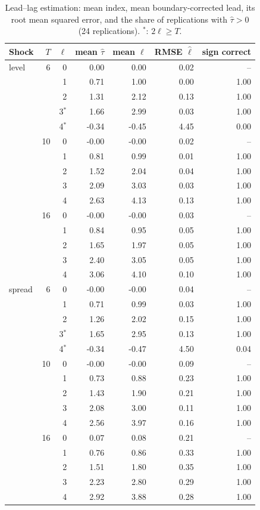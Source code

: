 \documentclass[12pt]{article}
\begin{document}
\begin{table}[h]
\caption{Lead--lag estimation: mean index, mean boundary-corrected lead, its root mean squared error, and the share of replications with $\hat\tau>0$ (24 replications). $^\ast$: $2\ell\ge T$.}\label{tab:ll}
\centering\footnotesize
\begin{tabular}{lrrrrrr}
\toprule
Shock & $T$ & $\ell$ & mean $\hat\tau$ & mean $\hat\ell$ & RMSE $\hat\ell$ & sign correct\\
\midrule
level & 6 & 0 & 0.00 & 0.00 & 0.02 & --\\
 &  & 1 & 0.71 & 1.00 & 0.00 & 1.00\\
 &  & 2 & 1.31 & 2.12 & 0.13 & 1.00\\
 &  & 3$^\ast$ & 1.66 & 2.99 & 0.03 & 1.00\\
 &  & 4$^\ast$ & -0.34 & -0.45 & 4.45 & 0.00\\
\addlinespace
 & 10 & 0 & -0.00 & -0.00 & 0.02 & --\\
 &  & 1 & 0.81 & 0.99 & 0.01 & 1.00\\
 &  & 2 & 1.52 & 2.04 & 0.04 & 1.00\\
 &  & 3 & 2.09 & 3.03 & 0.03 & 1.00\\
 &  & 4 & 2.63 & 4.13 & 0.13 & 1.00\\
\addlinespace
 & 16 & 0 & -0.00 & -0.00 & 0.03 & --\\
 &  & 1 & 0.84 & 0.95 & 0.05 & 1.00\\
 &  & 2 & 1.65 & 1.97 & 0.05 & 1.00\\
 &  & 3 & 2.40 & 3.05 & 0.05 & 1.00\\
 &  & 4 & 3.06 & 4.10 & 0.10 & 1.00\\
\addlinespace
spread & 6 & 0 & -0.00 & -0.00 & 0.04 & --\\
 &  & 1 & 0.71 & 0.99 & 0.03 & 1.00\\
 &  & 2 & 1.26 & 2.02 & 0.15 & 1.00\\
 &  & 3$^\ast$ & 1.65 & 2.95 & 0.13 & 1.00\\
 &  & 4$^\ast$ & -0.34 & -0.47 & 4.50 & 0.04\\
\addlinespace
 & 10 & 0 & -0.00 & -0.00 & 0.09 & --\\
 &  & 1 & 0.73 & 0.88 & 0.23 & 1.00\\
 &  & 2 & 1.43 & 1.90 & 0.21 & 1.00\\
 &  & 3 & 2.08 & 3.00 & 0.11 & 1.00\\
 &  & 4 & 2.56 & 3.97 & 0.16 & 1.00\\
\addlinespace
 & 16 & 0 & 0.07 & 0.08 & 0.21 & --\\
 &  & 1 & 0.76 & 0.86 & 0.33 & 1.00\\
 &  & 2 & 1.51 & 1.80 & 0.35 & 1.00\\
 &  & 3 & 2.23 & 2.80 & 0.29 & 1.00\\
 &  & 4 & 2.92 & 3.88 & 0.28 & 1.00\\
\bottomrule
\end{tabular}

\end{table}
\end{document}
